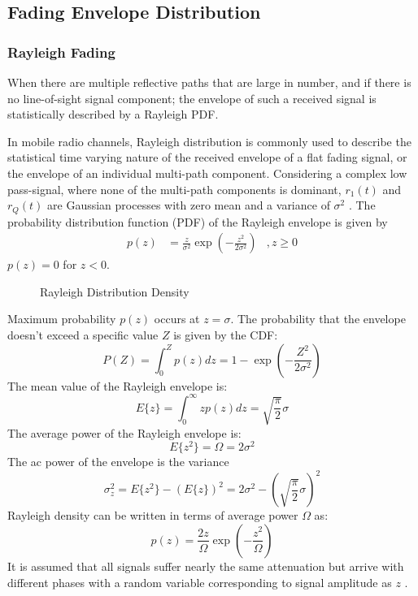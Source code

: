 \subsection{Fading Envelope Distribution}
\subsubsection{Rayleigh Fading}
When there are multiple reflective paths that are large in number, and if there is no line-of-sight signal component; the envelope of such a received signal is statistically described by a Rayleigh \gls{PDF}\cite{AWGN}.

In mobile radio channels, Rayleigh distribution is commonly used to describe the statistical time varying nature of the received envelope of a flat fading signal, or the envelope of an individual multi-path component\cite{4vn}.
Considering a complex low pass-signal, where none of the multi-path components is dominant, $r_1(t)$ and $r_Q(t)$ are Gaussian processes with zero mean and a variance of $\sigma^2$ \cite{fuqin}.
The probability distribution function (PDF) of the Rayleigh envelope is given by
\begin{align*}
p(z) &= \frac{z}{\sigma^2}\exp{\left( -\frac{z^2}{2\sigma^2}\right)}&, z\geq 0
\end{align*}
$p(z)=0$ for $z<0$\cite{fuqin}. 
\begin{figure}[h!]
	\centerline{\resizebox{14cm}{!}{}}
	\caption{Rayleigh Distribution Density}
	\label{fig:ray_pd}
\end{figure}
Maximum probability $p(z)$ occurs at $z=\sigma$. The probability that the envelope doesn't exceed a specific value $Z$ is given by the \gls{CDF}:
$$P(Z) = \int_0^Zp(z)dz = 1- \exp{\left( -\frac{Z^2}{2\sigma^2}\right)}$$
The mean value of the Rayleigh envelope is:
$$E\{ z\} = \int_0^\infty zp(z)dz = \sqrt{\frac{\pi}{2}}\sigma$$
The average power of the Rayleigh envelope is:
$$E\{z^2\} = \Omega = 2\sigma^2$$
The ac power of the envelope is the variance
$$\sigma_z^2 = E\{z^2\} - (E\{z\})^2 = 2\sigma^2 - \left(\sqrt{\frac{\pi}{2}}\sigma\right)^2$$
Rayleigh density can be written in terms of average power $\Omega$ as:
$$p(z) = \frac{2z}{\Omega}\exp{\left( -\frac{z^2}{\Omega}\right)}$$
It is assumed that all signals suffer nearly the same attenuation but arrive with different phases with a random variable corresponding to signal amplitude as $z$ \cite{Hindu}. 
 
